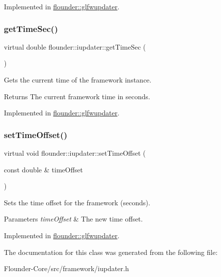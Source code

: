 Implemented in \hyperlink{classflounder_1_1glfwupdater_a6393f60d2b0f84a78ccf14b0c55ae1ee}{flounder\+::glfwupdater}.

\mbox{\label{classflounder_1_1iupdater_a071086b844e1f90d7f3577e80c9c09fe}} 
\subsubsection{\texorpdfstring{get\+Time\+Sec()}{getTimeSec()}}
{\footnotesize\ttfamily virtual double flounder\+::iupdater\+::get\+Time\+Sec (\begin{DoxyParamCaption}{ }\end{DoxyParamCaption})\hspace{0.3cm}{\ttfamily [pure virtual]}}



Gets the current time of the framework instance. 

\begin{DoxyReturn}{Returns}
The current framework time in seconds. 
\end{DoxyReturn}


Implemented in \hyperlink{classflounder_1_1glfwupdater_a6982b83970693347bfa460adc04cf984}{flounder\+::glfwupdater}.

\mbox{\label{classflounder_1_1iupdater_aa6aa143e40a5a39bcd53753798438ea1}} 
\subsubsection{\texorpdfstring{set\+Time\+Offset()}{setTimeOffset()}}
{\footnotesize\ttfamily virtual void flounder\+::iupdater\+::set\+Time\+Offset (\begin{DoxyParamCaption}\item[{const double \&}]{time\+Offset }\end{DoxyParamCaption})\hspace{0.3cm}{\ttfamily [pure virtual]}}



Sets the time offset for the framework (seconds). 


\begin{DoxyParams}{Parameters}
{\em time\+Offset} & The new time offset. \\
\hline
\end{DoxyParams}


Implemented in \hyperlink{classflounder_1_1glfwupdater_a7dc4371863e39a3a7870e4a2ac539fed}{flounder\+::glfwupdater}.



The documentation for this class was generated from the following file\+:\begin{DoxyCompactItemize}
\item 
Flounder-\/\+Core/src/framework/iupdater.\+h\end{DoxyCompactItemize}
